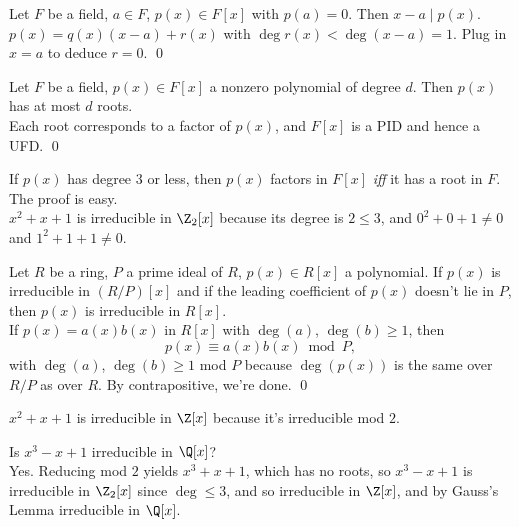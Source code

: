 \cor Let $F$ be a field, $a\in F$, $p(x)\in F[x]$ with $p(a)=0$.  Then $x-a\mid p(x)$. \\
\pf $p(x)=q(x)(x-a)+r(x)$ with $\deg r(x)<\deg(x-a)=1$.  Plug in $x=a$ to deduce $r=0$. \qed

\cor Let $F$ be a field, $p(x)\in F[x]$ a nonzero polynomial of degree $d$.  Then $p(x)$ has at most $d$ roots. \\
\pf Each root corresponds to a factor of $p(x)$, and $F[x]$ is a PID and hence a UFD. \qed

If $p(x)$ has degree 3 or less, then $p(x)$ factors in $F[x]$ \emph{iff} it has a root in $F$.  The proof is easy. \\
\eg $x^2+x+1$ is irreducible in $\Z_2[x]$ because its degree is $2\leq3$, and $0^2+0+1\neq0$ and $1^2+1+1\neq0$.

\thm Let $R$ be a ring, $P$ a prime ideal of $R$, $p(x)\in R[x]$ a polynomial.  If $p(x)$ is irreducible in $(R/P)[x]$ and if the leading coefficient of $p(x)$ doesn't lie in $P$, then $p(x)$ is irreducible in $R[x]$. \\
\pf If $p(x)=a(x)b(x)$ in $R[x]$ with $\deg(a)$, $\deg(b)\geq1$, then
\[ p(x) \equiv a(x) b(x) \bmod P , \]
with $\deg(a)$, $\deg(b)\geq1$ mod $P$ because $\deg(p(x))$ is the same over $R/P$ as over $R$.  By contrapositive, we're done. \qed

\eg $x^2+x+1$ is irreducible in $\Z[x]$ because it's irreducible mod $2$.

\eg Is $x^3-x+1$ irreducible in $\Q[x]$? \\
Yes.  Reducing mod $2$ yields $x^3+x+1$, which has no roots, so $x^3-x+1$ is irreducible in $\Z_2[x]$ since $\deg\leq3$, and so irreducible in $\Z[x]$, and by Gauss's Lemma irreducible in $\Q[x]$.

